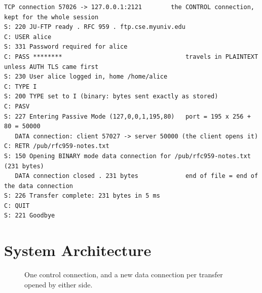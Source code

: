 \documentclass[11pt,a4paper]{article}
\begin{document}
\begin{lstlisting}[numbers=none, caption={A passive-mode download, as recorded by the dashboard (C = client, S = server).}]
   TCP connection 57026 -> 127.0.0.1:2121        the CONTROL connection, kept for the whole session
S: 220 JU-FTP ready . RFC 959 . ftp.cse.myuniv.edu
C: USER alice
S: 331 Password required for alice
C: PASS ********                                  travels in PLAINTEXT unless AUTH TLS came first
S: 230 User alice logged in, home /home/alice
C: TYPE I
S: 200 TYPE set to I (binary: bytes sent exactly as stored)
C: PASV
S: 227 Entering Passive Mode (127,0,0,1,195,80)   port = 195 x 256 + 80 = 50000
   DATA connection: client 57027 -> server 50000 (the client opens it)
C: RETR /pub/rfc959-notes.txt
S: 150 Opening BINARY mode data connection for /pub/rfc959-notes.txt (231 bytes)
   DATA connection closed . 231 bytes             end of file = end of the data connection
S: 226 Transfer complete: 231 bytes in 5 ms
C: QUIT
S: 221 Goodbye
\end{lstlisting}

\section{System Architecture}

\begin{figure}[H]
\centering
{}
\caption{One control connection, and a new data connection per transfer opened by either side.}
\end{figure}
\end{document}
